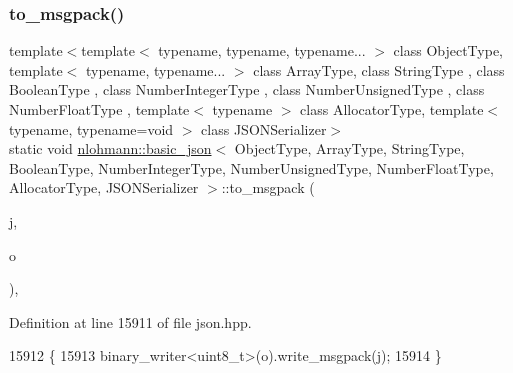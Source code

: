 \subsubsection{\texorpdfstring{to\+\_\+msgpack()}{to\_msgpack()}\hspace{0.1cm}{\footnotesize\ttfamily [2/3]}}
{\footnotesize\ttfamily template$<$template$<$ typename, typename, typename... $>$ class Object\+Type, template$<$ typename, typename... $>$ class Array\+Type, class String\+Type , class Boolean\+Type , class Number\+Integer\+Type , class Number\+Unsigned\+Type , class Number\+Float\+Type , template$<$ typename $>$ class Allocator\+Type, template$<$ typename, typename=void $>$ class J\+S\+O\+N\+Serializer$>$ \\
static void \hyperlink{classnlohmann_1_1basic__json}{nlohmann\+::basic\+\_\+json}$<$ Object\+Type, Array\+Type, String\+Type, Boolean\+Type, Number\+Integer\+Type, Number\+Unsigned\+Type, Number\+Float\+Type, Allocator\+Type, J\+S\+O\+N\+Serializer $>$\+::to\+\_\+msgpack (\begin{DoxyParamCaption}\item[{const \hyperlink{classnlohmann_1_1basic__json}{basic\+\_\+json}$<$ Object\+Type, Array\+Type, String\+Type, Boolean\+Type, Number\+Integer\+Type, Number\+Unsigned\+Type, Number\+Float\+Type, Allocator\+Type, J\+S\+O\+N\+Serializer $>$ \&}]{j,  }\item[{\hyperlink{classnlohmann_1_1detail_1_1output__adapter}{detail\+::output\+\_\+adapter}$<$ uint8\+\_\+t $>$}]{o }\end{DoxyParamCaption})\hspace{0.3cm}{\ttfamily [inline]}, {\ttfamily [static]}}



Definition at line 15911 of file json.\+hpp.


\begin{DoxyCode}
15912     \{
15913         binary\_writer<uint8\_t>(o).write\_msgpack(j);
15914     \}
\end{DoxyCode}
\mbox{\label{classnlohmann_1_1basic__json_a99efe44b502de2762a433ce3688ec2d2}} 
